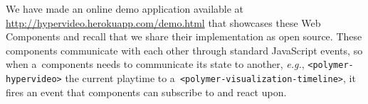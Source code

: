 \documentclass[runningheads,a4paper]{llncs}
\begin{document}
\noindent We have made an online demo application available at
\url{http://hypervideo.herokuapp.com/demo.html} that showcases these Web Components
and recall that we share their implementation as open source.
These components communicate with each other through standard JavaScript events,
so when a~components needs to communicate its state to another, \emph{e.g.},
\texttt{<polymer-hypervideo>} the current playtime to
a~\texttt{<polymer-visualization-timeline>},
it fires an event that components can subscribe to and react upon.

\end{document}
